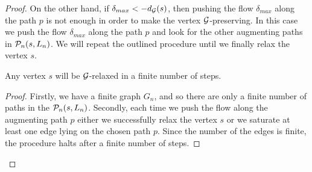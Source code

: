\documentclass[12pt,oneside,a4paper]{amsart}
\begin{document}
\begin{proof}
        On the other hand, if $\delta_{max} < -d_{\cal{G}}(s)$, then pushing the flow $\delta_{max}$ along the path $p$ is not enough
          in order to make the vertex $\cal{G}$-preserving.
        In this case we push the flow $\delta_{max}$ along the path $p$ and look for the other augmenting paths in $\gnpaths(s, L_n)$.
        We will repeat the outlined procedure until we finally relax the vertex $s$.
        \begin{prop}
          Any vertex $s$ will be $\cal{G}$-relaxed in a finite number of steps.
        \end{prop}
        \begin{proof}
          Firstly, we have a finite graph $G_{n}$, and so there are only a finite number of paths in the $\gnpaths(s, L_n)$.
          Secondly, each time we push the flow along the augmenting path $p$ either we successfully relax the vertex $s$
            or we saturate at least one edge lying on the chosen path $p$.
          Since the number of the edges is finite, the procedure halts after a finite number of steps.


\end{proof}
\end{proof}
\end{document}
